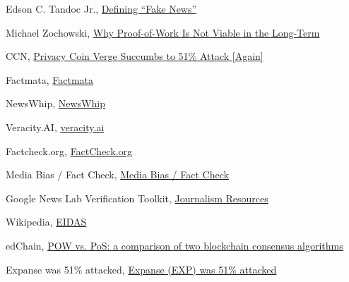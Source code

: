 \documentclass[target=mst,aauheader=]{thud}
\begin{document}

\begin{thebibliography}{99}

    Edson C. Tandoc Jr., \href{https://www.tandfonline.com/doi/abs/10.1080/21670811.2017.1360143}{Defining “Fake News”}

    Michael Zochowski, \href{https://medium.com/logos-network/why-proof-of-work-is-not-viable-in-the-long-term-dd96d2775e99}{Why Proof-of-Work Is Not Viable in the Long-Term}

    CCN, \href{https://www.ccn.com/privacy-coin-verge-succumbs-to-51-attack-again/}{Privacy Coin Verge Succumbs to 51\% Attack [Again]}

    Factmata, \href{https://factmata.com/}{Factmata}

    NewsWhip, \href{https://www.newswhip.com/}{NewsWhip}

    Veracity.AI, \href{https://veracityai.com/en/}{veracity.ai}

    Factcheck.org, \href{https://www.factcheck.org/}{FactCheck.org}

    Media Bias / Fact Check, \href{https://mediabiasfactcheck.com/}{Media Bias / Fact Check}

    Google News Lab Verification Toolkit, \href{https://newsinitiative.withgoogle.com/resources/journalism/}{Journalism Resources}

    Wikipedia, \href{https://en.wikipedia.org/wiki/EIDAS}{EIDAS}


    edChain, \href{https://medium.com/@EdChain/pow-vs-pos-a-comparison-of-two-blockchain-consensus-algorithms-f3effdae55f5}{POW vs. PoS: a comparison of two blockchain consensus algorithms}

    Expanse was 51\% attacked, \href{https://gist.github.com/metalicjames/01222049f95f85df8c0eb253de54848b}{Expanse (EXP) was 51\% attacked}


\end{thebibliography}
\end{document}
